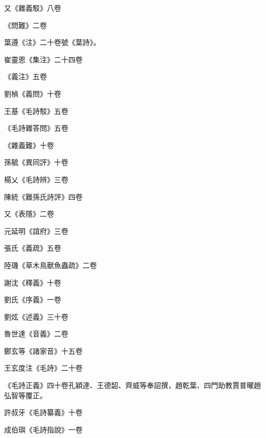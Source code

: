 \begin{pinyinscope}
 又《雜義駁》八卷



 《問難》二卷



 葉遵《注》二十卷號《葉詩》。



 崔靈恩《集注》二十四卷



 《義注》五卷



 劉楨《義問》十卷



 王基《毛詩駁》五卷



 《毛詩雜答問》五卷



 《雜義難》十卷



 孫毓《異同評》十卷



 楊乂《毛詩辨》三卷



 陳統《難孫氏詩評》四卷



 又《表隱》二卷



 元延明《誼府》三卷



 張氏《義疏》五卷



 陸璣《草木鳥獸魚蟲疏》二卷



 謝沈《釋義》十卷



 劉氏《序義》一卷



 劉炫《述義》三十卷



 魯世達《音義》二卷



 鄭玄等《諸家音》十五卷



 王玄度注《毛詩》二十卷



 《毛詩正義》四十卷孔穎達、王德韶、齊威等奉詔撰，趙乾葉、四門助教賈普曜趙弘智等覆正。



 許叔牙《毛詩纂義》十卷



 成伯璵《毛詩指說》一卷




\end{pinyinscope}

